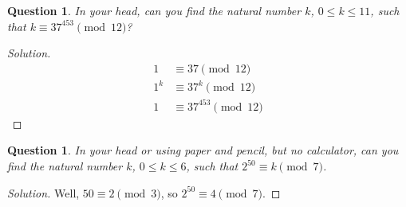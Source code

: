 \documentclass[12pt,leqno]{article}
\numberwithin{equation}{section}
\newtheorem{ques}[thm]{Question}
\theoremstyle{definition}
\begin{document}
\begin{ques}
In your head, can you find the natural number $k$, $0 \leq k \leq
11$, such that $k \equiv 37^{453} \pmod{12}$?
\end{ques}

\begin{proof}[Solution]
\begin{align*}
1 &\equiv 37 \pmod{12} \\
1^k &\equiv 37^k \pmod{12} \\
1 &\equiv 37^{453} \pmod{12}
\end{align*}
\end{proof}

\begin{ques}
In your head or using paper and pencil, but no calculator, can you
find the natural number $k$, $0 \leq k \leq 6$, such that $2^{50}
\equiv k \pmod{7}$.
\end{ques}

\begin{proof}[Solution]
Well, $50 \equiv 2 \pmod{3}$, so $2^{50} \equiv 4 \pmod{7}$.
\end{proof}
\end{document}
